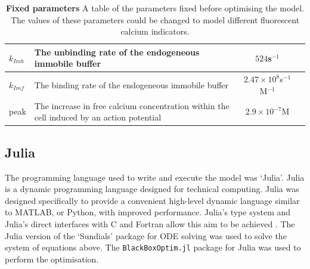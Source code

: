 \documentclass[a4paper,12pt]{article}
\theoremstyle{definition}
\begin{document}
\begin{table}
\begin{tabular}[t]{|l|p{6cm}|c|c|}
        $k_{Imb}$           & The unbinding rate of the endogeneous immobile buffer                                     & $524$s$^{-1}$                         & \cite{bartol} \\ \hline
        $k_{Imf}$           & The binding rate of the endogeneous immobile buffer                                       & $2.47 \times 10^{8}$s$^{-1}$M$^{-1}$  & \cite{bartol} \\ \hline
        peak                & The increase in free calcium concentration within the cell induced by an action potential & $2.9 \times 10^{-7}$M                 & \cite{maravall} \\ \hline
    \end{tabular}
    \caption{\textbf{Fixed parameters} A table of the parameters fixed before optimising the model. The values of these parameters could be changed to model different fluorescent calcium indicators.}
    \label{tab:fixed_parameters}
\end{table}

\subsection{Julia}
The programming language used to write and execute the model was `Julia'. Julia is a dynamic programming language designed for technical computing. Julia was designed specifically to provide a convenient high-level dynamic language similar to MATLAB, or Python, with improved performance. Julia's type system and Julia’s direct interfaces with C and Fortran allow this aim to be achieved \cite{bezanson}. The Julia version of the `Sundials' package for ODE solving was used to solve the system of equations above. The \texttt{BlackBoxOptim.jl} package for Julia was used to perform the optimisation.
\end{document}

